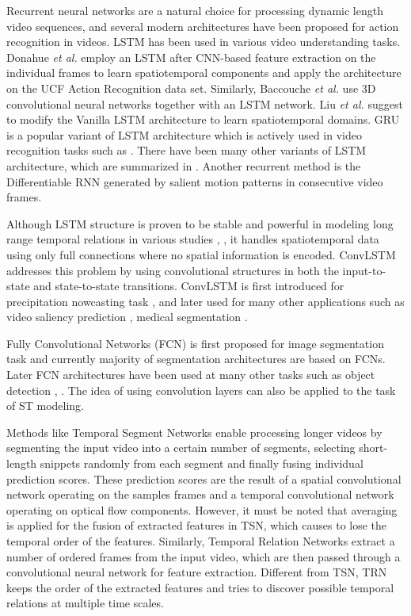 \documentclass[runningheads]{llncs}
\begin{document}
Recurrent neural networks are a natural choice for processing dynamic length video sequences, and several modern architectures have been proposed for action recognition in videos. LSTM \cite{hochreiter1997long} has been used in various video understanding tasks. Donahue \textit{et al.} \cite{Donahue2017-cf} employ an LSTM after CNN-based feature extraction on the individual frames to learn spatiotemporal components and apply the architecture on the UCF Action Recognition data set. Similarly, Baccouche \textit{et al.} \cite{Baccouche2011-pl} use 3D convolutional neural networks together with an LSTM network. Liu \textit{et al.} \cite{Liu2016-ls} suggest to modify the Vanilla LSTM architecture to learn spatiotemporal domains. GRU \cite{cho2014properties} is a popular variant of LSTM architecture which is actively used in video recognition tasks such as \cite{Dwibedi2018-hj}. There have been many other variants of LSTM architecture, which are summarized in \cite{greff2016lstm}. Another recurrent method is the Differentiable RNN \cite{veeriah2015differential} generated by salient motion patterns in consecutive video frames. 

Although LSTM structure is proven to be stable and powerful in modeling long range temporal relations in various studies \cite{sutskever2014sequence}, \cite{graves2013generating}, it handles spatiotemporal data using only full connections where no spatial information is encoded. ConvLSTM \cite{xingjian2015convolutional} addresses this problem by using convolutional structures in both the input-to-state and state-to-state transitions. ConvLSTM is first introduced for precipitation nowcasting task \cite{xingjian2015convolutional}, and later used for many other applications such as video saliency prediction \cite{song2018pyramid}, medical segmentation \cite{zhang2019spatio}.

Fully Convolutional Networks (FCN) is first proposed for image segmentation task \cite{long2015fully} and currently majority of segmentation architectures are based on FCNs. Later FCN architectures have been used at many other tasks such as object detection \cite{ren2015faster}, \cite{redmon2016you}. The idea of using convolution layers can also be applied to the task of ST modeling.

Methods like Temporal Segment Networks \cite{Wang2016-gj} enable processing longer videos by segmenting the input video into a certain number of segments, selecting short-length snippets randomly from each segment and finally fusing individual prediction scores. These prediction scores are the result of a spatial convolutional network operating on the samples frames and a temporal convolutional network operating on optical flow components. However, it must be noted that averaging is applied for the fusion of extracted features in TSN, which causes to lose the temporal order of the features. Similarly, Temporal Relation Networks \cite{Zhou2018-ah} extract a number of ordered frames from the input video, which are then passed through a convolutional neural network for feature extraction. Different from TSN, TRN keeps the order of the extracted features and tries to discover possible temporal relations at multiple time scales. 
\end{document}
